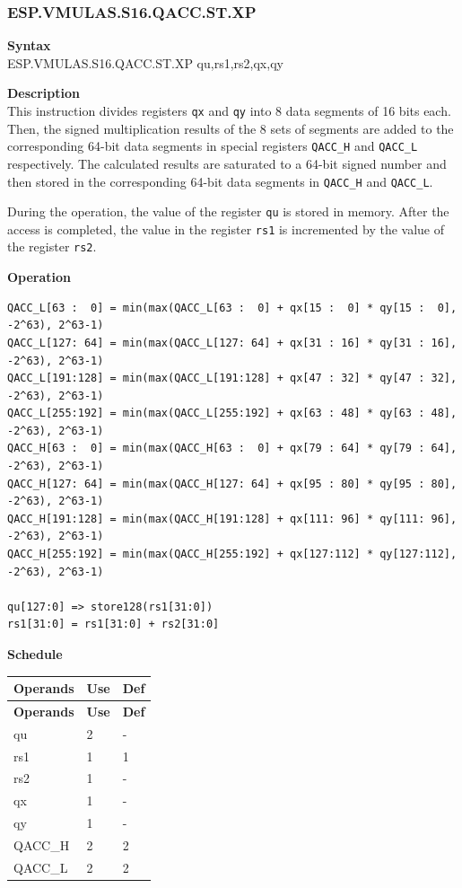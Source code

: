 \newpage
\subsubsection{ESP.VMULAS.S16.QACC.ST.XP}\label{instruction:ESPVMULASS16QACCSTXP}
\textbf{Syntax}\\
ESP.VMULAS.S16.QACC.ST.XP qu,rs1,rs2,qx,qy

\textbf{Description}\\
This instruction divides registers \lstinline{qx} and \lstinline{qy} into 8 data segments of 16 bits each. Then, the signed multiplication results of the 8 sets of segments are added to the corresponding 64-bit data segments in special registers \lstinline{QACC_H} and \lstinline{QACC_L} respectively. The calculated results are saturated to a 64-bit signed number and then stored in the corresponding 64-bit data segments in \lstinline{QACC_H} and \lstinline{QACC_L}.

During the operation, the value of the register \lstinline{qu} is stored in memory. After the access is completed, the value in the register \lstinline{rs1} is incremented by the value of the register \lstinline{rs2}.

\textbf{Operation}\\
\begin{lstlisting}
QACC_L[63 :  0] = min(max(QACC_L[63 :  0] + qx[15 :  0] * qy[15 :  0], -2^63), 2^63-1)
QACC_L[127: 64] = min(max(QACC_L[127: 64] + qx[31 : 16] * qy[31 : 16], -2^63), 2^63-1)
QACC_L[191:128] = min(max(QACC_L[191:128] + qx[47 : 32] * qy[47 : 32], -2^63), 2^63-1)
QACC_L[255:192] = min(max(QACC_L[255:192] + qx[63 : 48] * qy[63 : 48], -2^63), 2^63-1)
QACC_H[63 :  0] = min(max(QACC_H[63 :  0] + qx[79 : 64] * qy[79 : 64], -2^63), 2^63-1)
QACC_H[127: 64] = min(max(QACC_H[127: 64] + qx[95 : 80] * qy[95 : 80], -2^63), 2^63-1)
QACC_H[191:128] = min(max(QACC_H[191:128] + qx[111: 96] * qy[111: 96], -2^63), 2^63-1)
QACC_H[255:192] = min(max(QACC_H[255:192] + qx[127:112] * qy[127:112], -2^63), 2^63-1)

qu[127:0] => store128(rs1[31:0])
rs1[31:0] = rs1[31:0] + rs2[31:0]
\end{lstlisting}

\textbf{Schedule}\\
\begin{longtable}[c]{|l|l|l|}
    \hline
    \rowcolor{lightgray}
    \textbf{Operands} & \textbf{Use} & \textbf{Def} \\\hline
    \endfirsthead
    \hline
    \rowcolor{lightgray}
     \textbf{Operands} & \textbf{Use} & \textbf{Def} \\\hline
    \endhead
    \hline
    \endfoot

    qu & 2 & - \\\hline
    rs1 & 1 & 1 \\\hline
    rs2 & 1 & - \\\hline
     qx & 1 & - \\\hline
     qy & 1 & - \\\hline
     QACC\_H & 2 & 2 \\\hline
     QACC\_L & 2 & 2

\end{longtable}

